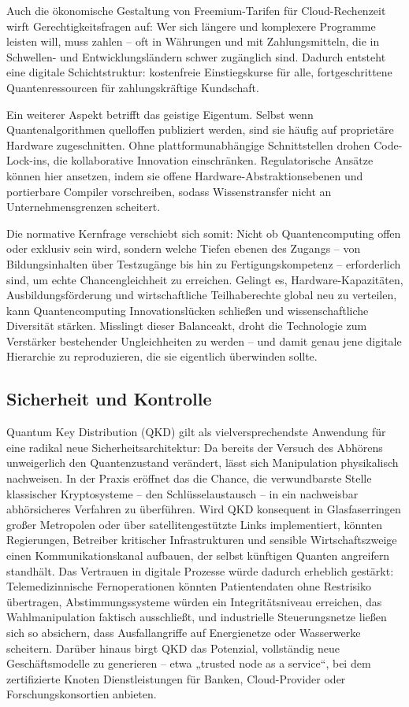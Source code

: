 Auch die ökonomische Gestaltung von Freemium-Tarifen für Cloud-Rechenzeit wirft Gerechtigkeitsfragen auf: Wer sich längere und komplexere Programme leisten will, muss zahlen – oft in Währungen und mit Zahlungsmitteln, die in Schwellen- und Entwicklungsländern schwer zugänglich sind. Dadurch entsteht eine digitale Schichtstruktur: kostenfreie Einstiegskurse für alle, fortgeschrittene Quantenressourcen für zahlungskräftige Kundschaft.

Ein weiterer Aspekt betrifft das geistige Eigentum. Selbst wenn Quantenalgorithmen quelloffen publiziert werden, sind sie häufig auf proprietäre Hardware zugeschnitten. Ohne plattformunabhängige Schnittstellen drohen Code-Lock-ins, die kollaborative Innovation einschränken. Regulatorische Ansätze können hier ansetzen, indem sie offene Hardware-Abstraktionsebenen und portierbare Compiler vorschreiben, sodass Wissenstransfer nicht an Unternehmensgrenzen scheitert.

Die normative Kernfrage verschiebt sich somit: Nicht ob Quantencomputing offen oder exklusiv sein wird, sondern welche Tiefen ebenen des Zugangs – von Bildungsinhalten über Testzugänge bis hin zu Fertigungskompetenz – erforderlich sind, um echte Chancengleichheit zu erreichen. Gelingt es, Hardware-Kapazitäten, Ausbildungsförderung und wirtschaftliche Teilhaberechte global neu zu verteilen, kann Quantencomputing Innovationslücken schließen und wissenschaftliche Diversität stärken. Misslingt dieser Balanceakt, droht die Technologie zum Verstärker bestehender Ungleichheiten zu werden – und damit genau jene digitale Hierarchie zu reproduzieren, die sie eigentlich überwinden sollte. \cite{seskirDemocratizationQuantumTechnologies2022}



\subsection{Sicherheit und Kontrolle}
Quantum Key Distribution (QKD) gilt als vielversprechendste Anwendung für eine radikal neue Sicherheitsarchitektur: Da bereits der Versuch des Abhörens unweigerlich den Quantenzustand verändert, lässt sich Manipulation physikalisch nachweisen. In der Praxis eröffnet das die Chance, die verwundbarste Stelle klassischer Kryptosysteme – den Schlüsselaustausch – in ein nachweisbar abhörsicheres Verfahren zu überführen. Wird QKD konsequent in Glasfaserringen großer Metropolen oder über satellitengestützte Links implementiert, könnten Regierungen, Betreiber kritischer Infrastrukturen und sensible Wirtschaftszweige einen Kommunikationskanal aufbauen, der selbst künftigen Quanten angreifern standhält. Das Vertrauen in digitale Prozesse würde dadurch erheblich gestärkt: Telemedizinnische Fernoperationen könnten Patientendaten ohne Restrisiko übertragen, Abstimmungssysteme würden ein Integritätsniveau erreichen, das Wahlmanipulation faktisch ausschließt, und industrielle Steuerungsnetze ließen sich so absichern, dass Ausfallangriffe auf Energienetze oder Wasserwerke scheitern. Darüber hinaus birgt QKD das Potenzial, vollständig neue Geschäftsmodelle zu generieren – etwa „trusted node as a service“, bei dem zertifizierte Knoten Dienstleistungen für Banken, Cloud-Provider oder Forschungskonsortien anbieten.

